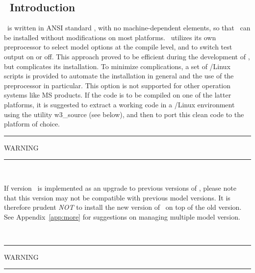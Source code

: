 \vssub
\subsection{~Introduction}
\vssub

\ws\ is written in ANSI standard , with no machine-dependent
elements, so that \ws\ can be installed without modifications on most
platforms. \ws\ utilizes its own preprocessor to select model options at the
compile level, and to switch test output on or off. This approach proved to be
efficient during the development of \ws, but complicates its installation. 
To minimize complications, a set of \unix/Linux scripts is provided to
automate the installation in general and the use of the preprocessor in
particular. This option is not supported for other operation systems like MS
products. If the code is to be compiled on one of the latter platforms, it is
suggested to extract a working code in a \unix/Linux environment using the
utility {\code w3\_source} (see below), and then to port this clean code to
the platform of choice.

\begin{center}
\rule[1mm]{55mm}{1.0mm} WARNING \rule[1mm]{55mm}{1.0mm} \\ 
\vspace{\baselineskip}
\parbox{120mm}{If version \WWver\ is implemented as an upgrade to previous
versions of \ws, please note that this version may not be compatible with
previous model versions. It is therefore prudent {\it NOT} to install the new
version of \ws\ on top of the old version. See Appendix~\ref{app:more} for
suggestions on managing multiple model version.} \\ \vspace{\baselineskip}
\rule[1mm]{55mm}{1.0mm} WARNING \rule[1mm]{55mm}{1.0mm}
\end{center}
